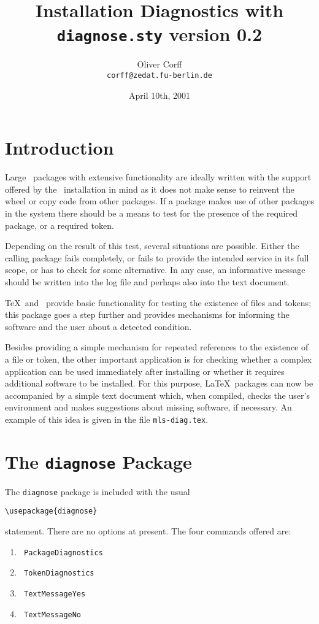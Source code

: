 \documentclass[10pt,a4paper]{article}
\title{Installation Diagnostics with\\\texttt{diagnose.sty} version 0.2}
\author{Oliver Corff\\\texttt{corff@zedat.fu-berlin.de}}
\date{April 10th, 2001}
\begin{document}
\maketitle
\tableofcontents
\section{Introduction}

Large \LaTeXe\ packages with extensive functionality are ideally
written with the support offered by the \LaTeXe\ installation in
mind as it does not make sense to reinvent the wheel or copy code
from other packages. If a package makes use of other packages in
the system there should be a means to test for the presence of
the required package, or a required token.

Depending on the result of this test, several situations are
possible. Either the calling package fails completely, or fails
to provide the intended service in its full scope, or has to check
for some alternative. In any case, an informative message should
be written into the log file and perhaps also into  the text document.

\TeX\ and \LaTeXe\ provide basic functionality for testing the
existence of files and tokens; this package goes a step further
and provides mechanisms for informing the software and the user
about a detected condition.

Besides providing a simple mechanism for repeated references to
the existence of a file or token,
the other important application is for checking whether a 
complex application can be used immediately after installing or
whether it requires additional software to be installed. For this 
purpose, \LaTeX\ packages can now be accompanied by a simple text
document which, when compiled, checks the user's environment and
makes suggestions about missing software, if necessary. An example
of this idea is given in the file \texttt{mls-diag.tex}.

\section{The \texttt{diagnose} Package}

The \texttt{diagnose} package is included with the usual
\begin{verbatim}
\usepackage{diagnose}
\end{verbatim}
statement. There are no options at present.
The four commands offered are:
\begin{enumerate}
	\item \texttt{ PackageDiagnostics}
	\item \texttt{ TokenDiagnostics}
	\item \texttt{ TextMessageYes}
	\item \texttt{ TextMessageNo}
\end{enumerate}
\end{document}
